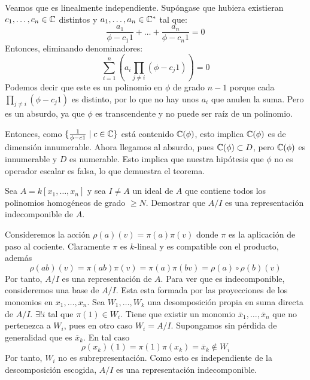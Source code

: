 \documentclass[twoside]{article}
\begin{document}
\begin{solucion}
Veamos que es linealmente independiente.
Supóngase que hubiera existieran $c_1,\dots,c_n \in \mathbb{C}$ distintos y $a_1,\dots,a_n \in \mathbb{C}^*$ tal que:
\[ \frac{a_1}{\phi - c_1 1} + \dots + \frac{a_n}{\phi - c_n 1} = 0 \]
Entonces, eliminando denominadores:
\[ \sum_{i=1}^n \left(a_i \prod_{j\neq i}(\phi - c_j 1)\right) = 0\]
Podemos decir que este es un polinomio en $\phi$ de grado $n-1$ porque cada $\prod_{j\neq i}(\phi - c_j 1)$ es distinto, por lo que no hay unos $a_i$ que anulen la suma.
Pero es un absurdo, ya que $\phi$ es transcendente y no puede ser raíz de un polinomio.

Entonces, como $\{\frac{1}{\phi - c 1} \mid c \in \mathbb{C}\}$ está contenido $\mathbb{C}(\phi)$, esto implica $\mathbb{C}(\phi)$ es de dimensión innumerable.
Ahora llegamos al absurdo, pues $\mathbb{C}(\phi) \subset D$, pero $\mathbb{C}(\phi)$ es innumerable y $D$ es numerable.
Esto implica que nuestra hipótesis que $\phi$ no es operador escalar es falsa, lo que demuestra el teorema.
\end{solucion}

\newpage




\begin{ejercicio}{1.24}
Sea $A = k[x_1,\dotsc,x_n]$ y sea $I\neq A$ un ideal de $A$ que contiene todos los polinomios homogéneos de grado $\geq N$. Demostrar que $A/I$ es una representación indecomponible de $A$. 
\end{ejercicio}
\begin{solucion}
Consideremos la acción $\rho(a)(v) = \pi(a)\pi(v)$ donde $\pi$ es la aplicación de paso al cociente. Claramente $\pi$ es $k$-lineal y es compatible con el producto, además
$$
\rho(ab)(v) = \pi(ab)\pi(v) =\pi(a)\pi(bv) = \rho(a)\circ \rho(b)(v)
$$
Por tanto, $A/I$ es una representación de $A$. Para ver que es indecomponible, consideremos una base de $A/I$. Esta esta formada por las proyecciones de los monomios en $x_1,\dotsc,x_n$. Sea $W_1,\dotsc,W_k$ una desomposición propia en suma directa de $A/I$. $\exists! i$ tal que $\pi(1)\in W_i$. Tiene que existir un monomio $\overline{x}_1,\dotsc,\overline{x}_n$ que no pertenezca a $W_i$, pues en otro caso $W_i = A/I$. Supongamos sin pérdida de generalidad que es $\overline{x}_k$. En tal caso
$$
\rho(x_k)(1) = \pi(1)\pi(x_k) = \overline{x}_k \notin W_i
$$
Por tanto, $W_i$ no es subrepresentación. Como esto es independiente de la descomposición escogida, $A/I$ es una representación indecomponible.
\end{solucion}


\newpage
\end{document}
